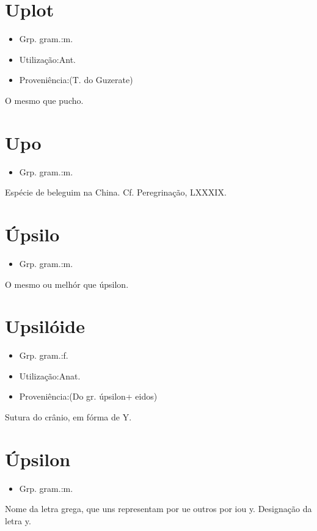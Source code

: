 \documentclass{article}
\begin{document}
\section{Uplot}
\begin{itemize}
\item {Grp. gram.:m.}
\end{itemize}
\begin{itemize}
\item {Utilização:Ant.}
\end{itemize}
\begin{itemize}
\item {Proveniência:(T. do Guzerate)}
\end{itemize}
O mesmo que \textunderscore pucho\textunderscore .
\section{Upo}
\begin{itemize}
\item {Grp. gram.:m.}
\end{itemize}
Espécie de beleguim na China. Cf. \textunderscore Peregrinação\textunderscore , LXXXIX.
\section{Úpsilo}
\begin{itemize}
\item {Grp. gram.:m.}
\end{itemize}
O mesmo ou melhór que \textunderscore úpsilon\textunderscore .
\section{Upsilóide}
\begin{itemize}
\item {Grp. gram.:f.}
\end{itemize}
\begin{itemize}
\item {Utilização:Anat.}
\end{itemize}
\begin{itemize}
\item {Proveniência:(Do gr. \textunderscore úpsilon\textunderscore  + \textunderscore eidos\textunderscore )}
\end{itemize}
Sutura do crânio, em fórma de Y.
\section{Úpsilon}
\begin{itemize}
\item {Grp. gram.:m.}
\end{itemize}
Nome da letra grega, que uns representam por \textunderscore u\textunderscore  e outros por \textunderscore i\textunderscore  ou \textunderscore y\textunderscore .
Designação da letra \textunderscore y\textunderscore .
\end{document}
